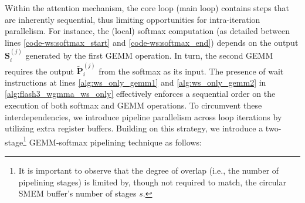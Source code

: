 Within the attention mechanism, the core loop (main loop) contains steps that are inherently sequential, thus limiting opportunities for intra-iteration parallelism. For instance, the (local) softmax computation (as detailed between lines \ref{code-ws:softmax_start} and \ref{code-ws:softmax_end}) depends on the output $\mathbf{S}_i^{(j)}$ generated by the first GEMM operation. In turn, the second GEMM requires the output $\widetilde{\mathbf{P}}_i^{(j)}$ from the softmax as its input. The presence of wait instructions at lines \ref{alg:ws_only_gemm1} and \ref{alg:ws_only_gemm2} in \cref{alg:flash3_wgmma_ws_only} effectively enforces a sequential order on the execution of both softmax and GEMM operations. To circumvent these interdependencies, we introduce pipeline parallelism across loop iterations by utilizing extra register buffers. Building on this strategy, we introduce a two-stage\footnote{It is important to observe that the degree of overlap (i.e., the number of pipelining stages) is limited by, though not required to match, the circular SMEM buffer’s number of stages $s$.} GEMM-softmax pipelining technique as follows:

